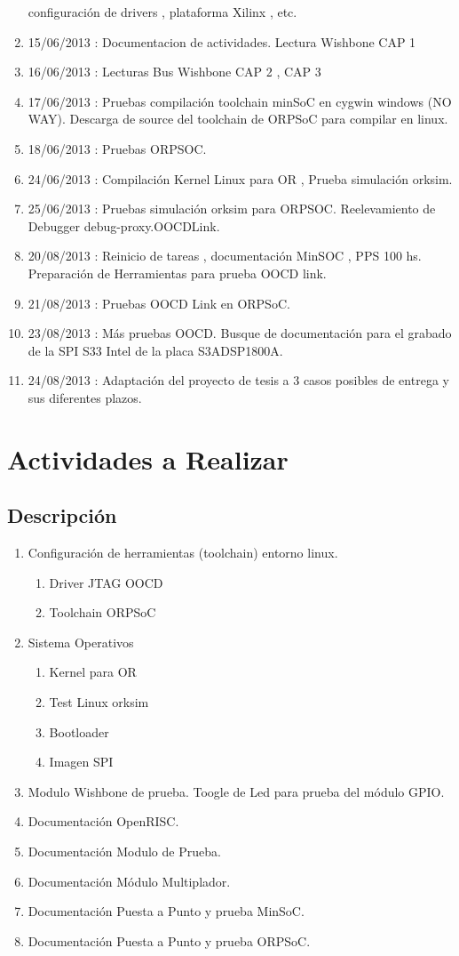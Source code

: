 \documentclass[12pt,a4paper]{article}
\begin{document}
\begin{enumerate}
  configuración de drivers , plataforma Xilinx , etc.
  \item 15/06/2013 : Documentacion de actividades. Lectura Wishbone CAP 1
  \item 16/06/2013 : Lecturas Bus Wishbone CAP 2 , CAP 3
  \item 17/06/2013 : Pruebas compilación toolchain minSoC en cygwin windows (NO
  WAY). Descarga de source del toolchain de ORPSoC para compilar en linux.
  \item 18/06/2013 : Pruebas ORPSOC.
  \item 24/06/2013 : Compilación Kernel Linux para OR , Prueba simulación
  orksim.
  \item 25/06/2013 : Pruebas simulación orksim para ORPSOC. Reelevamiento de
  Debugger debug-proxy.OOCDLink.
  \item 20/08/2013 : Reinicio de tareas , documentación MinSOC , PPS 100 hs.
  Preparación de Herramientas para prueba OOCD link.
  \item 21/08/2013 : Pruebas OOCD Link en ORPSoC. 
  \item 23/08/2013 : Más pruebas OOCD. Busque de documentación para el grabado
  de la SPI S33 Intel de la placa S3ADSP1800A.
  \item 24/08/2013 : Adaptación del proyecto de tesis a 3 casos posibles de
  entrega y sus diferentes plazos.
\end{enumerate}


\section{Actividades a Realizar}
\subsection{Descripción}
\begin{enumerate}
  \item Configuración de herramientas (toolchain) entorno linux.
  \begin{enumerate}
    \item Driver JTAG OOCD
    \item Toolchain ORPSoC  
  \end{enumerate}
  \item Sistema Operativos
  \begin{enumerate}
  	\item Kernel para OR 
    \item Test Linux orksim
    \item Bootloader
    \item Imagen SPI
  \end{enumerate} 
  \item Modulo Wishbone de prueba. Toogle de Led para prueba del módulo GPIO.
  \item Documentación OpenRISC.
  \item Documentación Modulo de Prueba.
  \item Documentación Módulo Multiplador.
  \item Documentación Puesta a Punto y prueba MinSoC.
  \item Documentación Puesta a Punto y prueba ORPSoC.
\end{enumerate}
\end{document}

